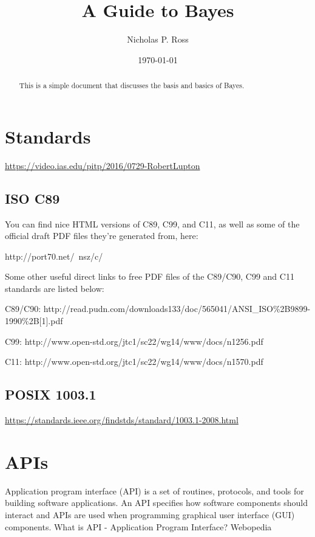 \documentclass[11pt]{article}
\begin{document}
\title{A Guide to Bayes}
\author{Nicholas P. Ross}
\date{\today}
\maketitle


\begin{abstract}
This is a simple document that discusses the basis and basics of Bayes. 
\end{abstract}


\tableofcontents


\newpage
\section{Standards}
\href{https://video.ias.edu/pitp/2016/0729-RobertLupton}{https://video.ias.edu/pitp/2016/0729-RobertLupton}

\subsection{ISO C89}
You can find nice HTML versions of C89, C99, and C11, as well as some of the official draft PDF files they're generated from, here:

http://port70.net/~nsz/c/

Some other useful direct links to free PDF files of the C89/C90, C99 and C11 standards are listed below:

C89/C90: http://read.pudn.com/downloads133/doc/565041/ANSI\_ISO\%2B9899-1990\%2B[1].pdf

C99: http://www.open-std.org/jtc1/sc22/wg14/www/docs/n1256.pdf

C11: http://www.open-std.org/jtc1/sc22/wg14/www/docs/n1570.pdf



\subsection{POSIX 1003.1}
\href{https://standards.ieee.org/findstds/standard/1003.1-2008.html}{https://standards.ieee.org/findstds/standard/1003.1-2008.html}




\newpage
\section{APIs}

Application program interface (API) is a set of routines, protocols, and tools for building software applications. An API specifies how software components should interact and APIs are used when programming graphical user interface (GUI) components.
What is API - Application Program Interface? Webopedia
\end{document}
